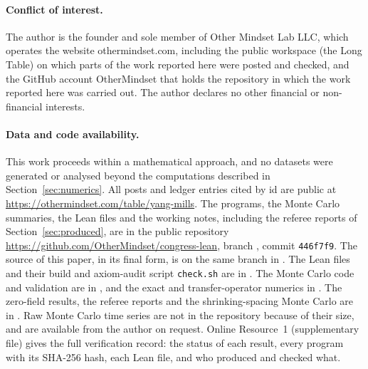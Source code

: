 \paragraph{Conflict of interest.} The author is the founder and sole member of Other Mindset Lab LLC, which operates the website othermindset.com, including the public workspace (the Long Table) on which parts of the work reported here were posted and checked, and the GitHub account OtherMindset that holds the repository in which the work reported here was carried out. The author declares no other financial or non-financial interests.

\paragraph{Data and code availability.} This work proceeds within a mathematical approach, and no datasets were generated or analysed beyond the computations described in Section~\ref{sec:numerics}. All posts and ledger entries cited by id are public at \url{https://othermindset.com/table/yang-mills}. The programs, the Monte Carlo summaries, the Lean files and the working notes, including the referee reports of Section~\ref{sec:produced}, are in the public repository \url{https://github.com/OtherMindset/congress-lean}, branch , commit \texttt{446f7f9}. The source of this paper, in its final form, is on the same branch in . The Lean files and their build and axiom-audit script \texttt{check.sh} are in . The Monte Carlo code and validation are in , and the exact and transfer-operator numerics in . The zero-field results, the referee reports and the shrinking-spacing Monte Carlo are in . Raw Monte Carlo time series are not in the repository because of their size, and are available from the author on request. Online Resource~1 (supplementary file) gives the full verification record: the status of each result, every program with its SHA-256 hash, each Lean file, and who produced and checked what.
